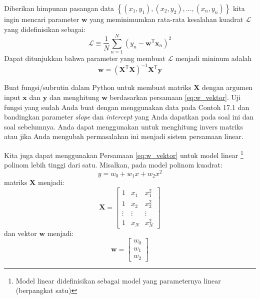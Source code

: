 Diberikan himpunan pasangan data
$\left\{(x_{1},y_{1}), (x_{2}, y_{2}), \ldots, (x_{n}, y_{n})\right\}$
kita ingin
mencari parameter $\mathbf{w}$ yang meminimumkan rata-rata kesalahan kuadrat
$\mathcal{L}$ yang didefinisikan sebagai:
\begin{equation}
\mathcal{L} \equiv \frac{1}{N} \sum_{n=1}^{N} \left( y_{n} - \mathbf{w}^{\mathsf{T}}
\mathbf{x}_{n} \right)^2
\end{equation}
Dapat ditunjukkan bahwa parameter yang membuat $\mathcal{L}$ menjadi mininum adalah
\begin{equation}
\mathbf{w} = \left(\mathbf{X}^{\mathsf{T}}\mathbf{X} \right)^{-1} \mathbf{X}^{\mathsf{T}} \mathbf{y}
\label{eq:w_vektor}
\end{equation}

\begin{soal}
Buat fungsi/subrutin dalam Python untuk membuat matriks $\mathbf{X}$ dengan argumen
input $\mathbf{x}$ dan $\mathbf{y}$ dan menghitung $\mathbf{w}$ berdasarkan
persamaan \eqref{eq:w_vektor}.
Uji fungsi yang sudah Anda buat dengan menggunakan data pada Contoh 17.1 dan bandingkan
parameter \textit{slope} dan \textit{intercept} yang Anda dapatkan pada soal ini dan
soal sebelumnya. Anda dapat menggunakan  untuk menghitung
invers matriks atau  jika Anda mengubah permasalahan
ini menjadi sistem persamaan linear.
\end{soal}

Kita juga dapat menggunakan Persamaan \eqref{eq:w_vektor} untuk model linear
\footnote{Model linear didefinisikan sebagai model yang parameternya linear
(berpangkat satu)} polinom lebih tinggi dari satu. Misalkan, pada model
polinom kuadrat:
\begin{equation}
y = w_{0} + w_{1} x + w_{2} x^2
\end{equation}
matriks $\mathbf{X}$ menjadi:
\begin{equation}
\mathbf{X} = \begin{bmatrix}
1 & x_{1} & x_{1}^2 \\
1 & x_{2} & x_{2}^2 \\
\vdots & \vdots & \vdots \\
1 & x_{N} & x_{N}^2
\end{bmatrix}
\end{equation}
dan vektor $\mathbf{w}$ menjadi:
\begin{equation}
\mathbf{w} = 
\begin{bmatrix}
w_{0} \\
w_{1} \\
w_{2}
\end{bmatrix}
\end{equation}

